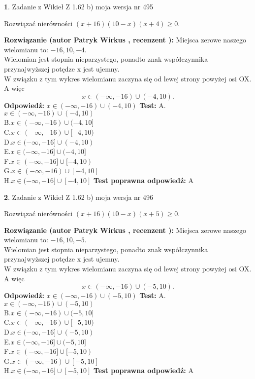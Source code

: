 \documentclass[12pt, a4paper]{article}
\theoremstyle{definition} %
\newtheorem{zad}{}
\newcommand{\zadStart}[1]{\begin{zad}#1\newline}
\newcommand{\zadStop}{\end{zad}}
\newcommand{\rozwStart}[2]{\noindent \textbf{Rozwiązanie (autor #1 , recenzent #2): }\newline}
\newcommand{\rozwStop}{\newline}
\newcommand{\odpStart}{\noindent \textbf{Odpowiedź:}\newline}
\newcommand{\odpStop}{\newline}
\newcommand{\testStart}{\noindent \textbf{Test:}\newline}
\newcommand{\testStop}{\newline}
\newcommand{\kluczStart}{\noindent \textbf{Test poprawna odpowiedź:}\newline}
\newcommand{\kluczStop}{\newline}
\begin{document}
\zadStart{Zadanie z Wikieł Z 1.62 b) moja wersja nr 495}

Rozwiązać nierówności $(x+16)(10-x)(x+4)\ge0$.
\zadStop
\rozwStart{Patryk Wirkus}{}
Miejsca zerowe naszego wielomianu to: $-16, 10, -4$.\\
Wielomian jest stopnia nieparzystego, ponadto znak współczynnika przy\linebreak najwyższej potędze x jest ujemny.\\ W związku z tym wykres wielomianu zaczyna się od lewej strony powyżej osi OX. A więc $$x \in (-\infty,-16) \cup (-4,10).$$
\rozwStop
\odpStart
$x \in (-\infty,-16) \cup (-4,10)$
\odpStop
\testStart
A.$x \in (-\infty,-16) \cup (-4,10)$\\
B.$x \in (-\infty,-16) \cup (-4,10]$\\
C.$x \in (-\infty,-16) \cup [-4,10)$\\
D.$x \in (-\infty,-16] \cup (-4,10)$\\
E.$x \in (-\infty,-16] \cup (-4,10]$\\
F.$x \in (-\infty,-16] \cup [-4,10)$\\
G.$x \in (-\infty,-16) \cup [-4,10]$\\
H.$x \in (-\infty,-16] \cup [-4,10]$
\testStop
\kluczStart
A
\kluczStop



\zadStart{Zadanie z Wikieł Z 1.62 b) moja wersja nr 496}

Rozwiązać nierówności $(x+16)(10-x)(x+5)\ge0$.
\zadStop
\rozwStart{Patryk Wirkus}{}
Miejsca zerowe naszego wielomianu to: $-16, 10, -5$.\\
Wielomian jest stopnia nieparzystego, ponadto znak współczynnika przy\linebreak najwyższej potędze x jest ujemny.\\ W związku z tym wykres wielomianu zaczyna się od lewej strony powyżej osi OX. A więc $$x \in (-\infty,-16) \cup (-5,10).$$
\rozwStop
\odpStart
$x \in (-\infty,-16) \cup (-5,10)$
\odpStop
\testStart
A.$x \in (-\infty,-16) \cup (-5,10)$\\
B.$x \in (-\infty,-16) \cup (-5,10]$\\
C.$x \in (-\infty,-16) \cup [-5,10)$\\
D.$x \in (-\infty,-16] \cup (-5,10)$\\
E.$x \in (-\infty,-16] \cup (-5,10]$\\
F.$x \in (-\infty,-16] \cup [-5,10)$\\
G.$x \in (-\infty,-16) \cup [-5,10]$\\
H.$x \in (-\infty,-16] \cup [-5,10]$
\testStop
\kluczStart
A
\kluczStop
\end{document}
